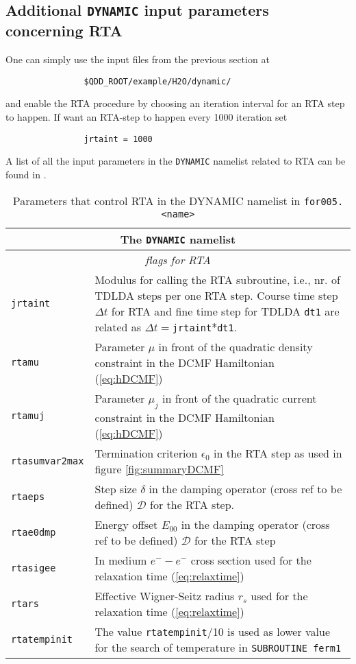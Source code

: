 \documentclass[11pt,a4paper]{article}
\begin{document}
		\subsection{Additional \texttt{DYNAMIC} input parameters concerning RTA}
			One can simply use the input files from the previous section at
			\begin{verbatim}
				$QDD_ROOT/example/H2O/dynamic/
			\end{verbatim}
			 and enable the RTA procedure by choosing an iteration interval for an RTA step to happen. If want an RTA-step to happen every 1000 iteration set
			\begin{verbatim}
				jrtaint = 1000
			\end{verbatim}
			A list of all the input parameters in the \texttt{DYNAMIC} namelist related to RTA can be found in .

			\begin{table}[!htbp]
				\caption{Parameters that control RTA in the DYNAMIC namelist in \texttt{for005.<name>}}\label{tab:dyn-input-params-rta}
				\begin{tabular}{|p{3.5cm}|p{11.2cm}|}
					\hline
					\multicolumn{2}{|c|}{The \texttt{DYNAMIC} namelist}\\
					\hline
					\multicolumn{2}{|c|}{\textit{\color{activeColor}flags for RTA}} \\
					\hline			
					\texttt{jrtaint} &  Modulus for calling the RTA subroutine, i.e., nr. of TDLDA steps per one RTA step. Course time step $\Delta t$ for RTA and fine time step for TDLDA \texttt{dt1} are related as $\Delta t=$\texttt{jrtaint}$*$\texttt{dt1}.\\
					\hline
					\texttt{rtamu} & Parameter $\mu$ in front of the quadratic density constraint in the DCMF Hamiltonian (\ref{eq:hDCMF})\\
					\hline
					\texttt{rtamuj} & Parameter $\mu_j$ in front of the quadratic current constraint in the DCMF Hamiltonian (\ref{eq:hDCMF})\\
					\hline
					\texttt{rtasumvar2max} & Termination criterion $\epsilon_0$ in the RTA step as used in figure \ref{fig:summaryDCMF}\\
					\hline
					\texttt{rtaeps} & Step size $\delta$ in the damping operator (cross ref to be defined) $\mathcal{D}$ for the RTA step.\\
					\hline
					\texttt{rtae0dmp} & Energy offset $E_{00}$ in the damping operator (cross ref to be defined) $\mathcal{D}$ for the RTA step\\
					\hline
					\texttt{rtasigee} & In medium $e^--e^-$ cross section used for the relaxation time (\ref{eq:relaxtime})\\
					\hline
					\texttt{rtars} & Effective Wigner-Seitz radius $r_s$ used for the relaxation time (\ref{eq:relaxtime})\\
					\hline
					\texttt{rtatempinit} & The value \texttt{rtatempinit}/10 is used as lower value for the search of temperature in \texttt{SUBROUTINE ferm1}\\
					\hline
				\end{tabular}
			\end{table}
\end{document}
